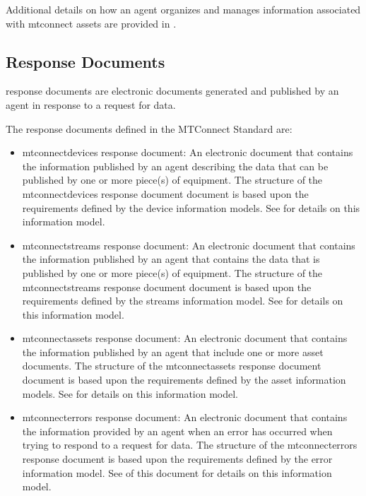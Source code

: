 \documentclass{mtconnect}	%
\begin{document}
Additional details on how an \gls{agent} organizes and manages information associated with \glspl{mtconnect asset} are provided in . 

\subsection{Response Documents}

\glspl{response document} are electronic documents generated and published by an \gls{agent} in response to a \gls{request} for data. 

The \glspl{response document} defined in the MTConnect Standard are:

\begin{itemize}

\item \gls{mtconnectdevices response document}:  An electronic document that contains the information published by an \gls{agent} describing the data that can be published by one or more piece(s) of equipment.  The structure of the \gls{mtconnectdevices response document} document is based upon the requirements defined by the \glspl{device information model}.  See  for details on this information model.

\item \gls{mtconnectstreams response document}:  An electronic document that contains the information published by an \gls{agent} that contains the data that is published by one or more piece(s) of equipment.  The structure of the \gls{mtconnectstreams response document} document is based upon the requirements defined by the \gls{streams information model}.  See  for details on this information model.

\item \gls{mtconnectassets response document}:  An electronic document that contains the information published by an \gls{agent} that \MAY include one or more \glspl{asset document}.  The structure of the \gls{mtconnectassets response document} document is based upon the requirements defined by the \glspl{asset information model}.  See  for details on this information model.

\item \gls{mtconnecterrors response document}:  An electronic document that contains the information provided by an \gls{agent} when an error has occurred when trying to respond to a \gls{request} for data.  The structure of the \gls{mtconnecterrors response document} is based upon the requirements defined by the \gls{error information model}.  See  of this document for details on this information model.

\end{itemize}
\end{document}
